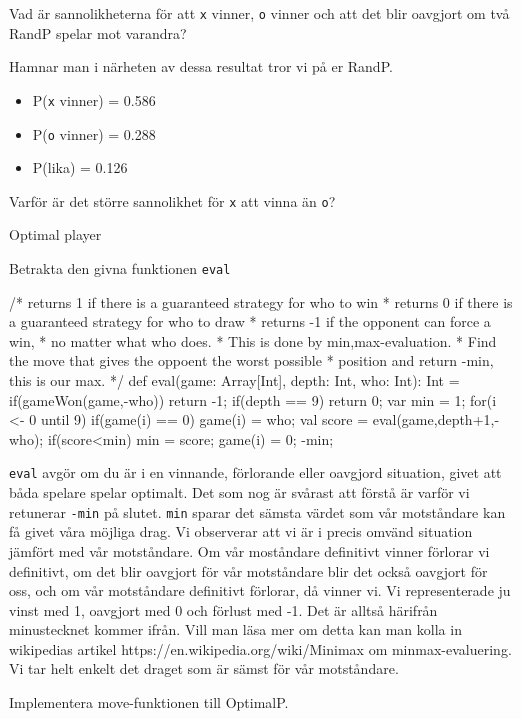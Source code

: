 \Subtask Vad är sannolikheterna för att \texttt{x} vinner, \texttt{o} vinner och att det blir oavgjort om två RandP spelar mot varandra?

Hamnar man i närheten av dessa resultat tror vi på er RandP.
\begin{itemize}
	\item P(\texttt{x} vinner) = 0.586
	\item P(\texttt{o} vinner) = 0.288
	\item P(lika) = 0.126
\end{itemize}

\Subtask Varför är det större sannolikhet för \texttt{x} att vinna än \texttt{o}?

\Task Optimal player

Betrakta den givna funktionen \texttt{eval}
\begin{Code}
/* returns 1 if there is a guaranteed strategy for who to win 
 * returns 0 if there is a guaranteed strategy for who to draw 
 * returns -1 if the opponent can force a win,
 * no matter what who does.
 * This is done by min,max-evaluation. 
 * Find the move that gives the oppoent the worst possible
 * position and return -min, this is our max.
 */
def eval(game: Array[Int], depth: Int, who: Int): Int = {
	if(gameWon(game,-who)) return -1;
	if(depth == 9) return 0;
	var min = 1;
	for(i <- 0 until 9) {
		if(game(i) == 0) {
			game(i) = who;
			val score = eval(game,depth+1,-who);
			if(score<min){
				min = score;
			}
			game(i) = 0;
		}
	}
	-min;
}
\end{Code}

\texttt{eval} avgör om du är i en vinnande, förlorande eller oavgjord situation, givet att båda spelare spelar optimalt. Det som nog är svårast att förstå är varför vi retunerar \texttt{-min} på slutet. \texttt{min} sparar det sämsta värdet som vår motståndare kan få givet våra möjliga drag. Vi observerar att vi är i precis omvänd situation jämfört med vår motståndare. Om vår moståndare definitivt vinner förlorar vi definitivt, om det blir oavgjort för vår motståndare blir det också oavgjort för oss, och om vår motståndare definitivt förlorar, då vinner vi. Vi representerade ju vinst med 1, oavgjort med 0 och förlust med -1. Det är alltså härifrån minustecknet kommer ifrån. Vill man läsa mer om detta kan man kolla in wikipedias artikel https://en.wikipedia.org/wiki/Minimax om minmax-evaluering. Vi tar helt enkelt det draget som är sämst för vår motståndare.

\Subtask Implementera move-funktionen till OptimalP.

